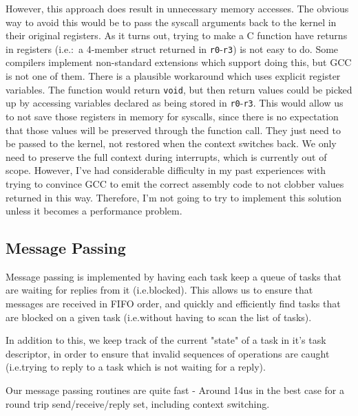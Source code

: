 \documentclass[titlepage]{article}
\begin{document}
However, this approach does result in unnecessary memory accesses.
The obvious way to avoid this would be to pass the syscall arguments back to the kernel
in their original registers.
As it turns out, trying to make a C function have returns in registers (i.e.:\ a 4-member
struct returned in \texttt{r0}-\texttt{r3}) is not easy to do.
Some compilers implement non-standard extensions which support doing this, but GCC
is not one of them.
There is a plausible workaround which uses explicit register variables.
The function would return \texttt{void}, but then return values could be picked up
by accessing variables declared as being stored in \texttt{r0}-\texttt{r3}.
This would allow us to not save those registers in memory for syscalls, since
there is no expectation that those values will be preserved through the function call.
They just need to be passed to the kernel, not restored when the context switches back.
We only need to preserve the full context during interrupts, which is
currently out of scope.
However, I've had considerable difficulty in my past experiences with trying to
convince GCC to emit the correct assembly code to not clobber values returned in this
way.
Therefore, I'm not going to try to implement this solution unless it becomes a
performance problem.

\subsection{Message Passing}
Message passing is implemented by having each task keep a queue
of tasks that are waiting for replies from it (i.e.\@ blocked). This allows us
to ensure that messages are received in FIFO order, and quickly and efficiently
find tasks that are blocked on a given task (i.e.\@ without having to scan the
list of tasks).

In addition to this, we keep track of the current "state" of a task in it's
task descriptor, in order to ensure that invalid sequences of operations are
caught (i.e.\@ trying to reply to a task which is not waiting for a reply).

Our message passing routines are quite fast - Around 14us in the best case for
a round trip send/receive/reply set, including context switching.
\end{document}
